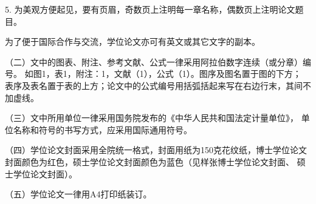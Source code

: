 5. 为美观方便起见，要有页眉，奇数页上注明每一章名称，偶数页上注明论文题目。

为了便于国际合作与交流，学位论文亦可有英文或其它文字的副本。

（二）文中的图表、附注、参考文献、公式一律采用阿拉伯数字连续（或分章）编号。
如图1，表1，附注：1，文献（1），公式（1）。图序及图名置于图的下方；
表序及表名置于表的上方；论文中的公式编号用括弧括起来写在右边行末，其间不加虚线。

（三）文中所用单位一律采用国务院发布的《中华人民共和国法定计量单位》，
单位名称和符号的书写方式，应采用国际通用符号。

（四）学位论文封面采用全院统一格式，封面用纸为150克花纹纸，博士学位论文
封面颜色为红色，硕士学位论文封面颜色为蓝色（见样张博士学位论文封面、
硕士学位论文封面）。

（五）学位论文一律用A4打印纸装订。
